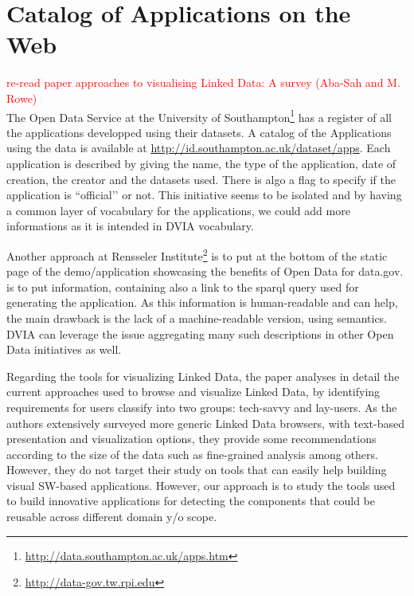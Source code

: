 \section{Catalog of Applications on the Web} \label{sec:rworks}
\textcolor{red}{re-read paper approaches to visualising Linked Data: A survey (Aba-Sah and M. Rowe)} \\

The Open Data Service at the University of Southampton\footnote{\url{http://data.southampton.ac.uk/apps.htm}} has a register of all the applications developped using their datasets. A catalog of the Applications using the data is available at \url{http://id.southampton.ac.uk/dataset/apps}. Each application is described by giving the name, the type of the application, date of creation, the creator and the datasets used. There is algo a flag to specify if the application is ``official’’ or not. This initiative seems to be isolated and by having a common layer of vocabulary for the applications, we could add more informations as it is intended in DVIA vocabulary. 

Another approach at Rensseler Institute\footnote{\url{http://data-gov.tw.rpi.edu}} is to put at the bottom of the static page of the demo/application showcasing the benefits of Open Data for data.gov. is to put information, containing also a link to the sparql query used for generating the application. As this information is human-readable and can help, the main drawback is the lack of a machine-readable version, using semantics. DVIA can leverage the issue aggregating many such descriptions in other Open Data initiatives as well. 

Regarding the tools for visualizing Linked Data,  the paper \cite{aba2011} analyses in detail the current approaches used to browse and visualize Linked Data, by identifying requirements for users classify into two groups: tech-savvy and lay-users. As the authors extensively surveyed more generic Linked Data browsers, with text-based presentation and visualization options, they provide some recommendations according to the size of the data such as fine-grained analysis among others. However, they do not target their study on tools that can easily help building visual SW-based applications. However, our approach is to study the tools used to build innovative applications for detecting the components that could be reusable across different domain y/o scope. 


